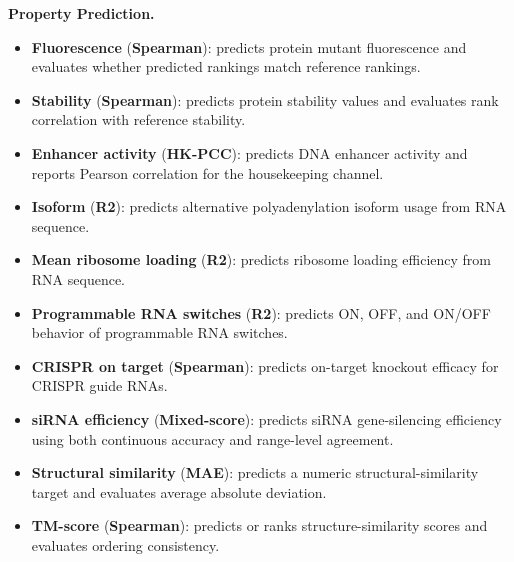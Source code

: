 \begin{appendices}
\textbf{Property Prediction.}
\begin{itemize}
    \item \textbf{Fluorescence} (\textbf{Spearman}): predicts protein mutant fluorescence and evaluates whether predicted rankings match reference rankings.
    \item \textbf{Stability} (\textbf{Spearman}): predicts protein stability values and evaluates rank correlation with reference stability.
    \item \textbf{Enhancer activity} (\textbf{HK-PCC}): predicts DNA enhancer activity and reports Pearson correlation for the housekeeping channel.
    \item \textbf{Isoform} (\textbf{R2}): predicts alternative polyadenylation isoform usage from RNA sequence.
    \item \textbf{Mean ribosome loading} (\textbf{R2}): predicts ribosome loading efficiency from RNA sequence.
    \item \textbf{Programmable RNA switches} (\textbf{R2}): predicts ON, OFF, and ON/OFF behavior of programmable RNA switches.
    \item \textbf{CRISPR on target} (\textbf{Spearman}): predicts on-target knockout efficacy for CRISPR guide RNAs.
    \item \textbf{siRNA efficiency} (\textbf{Mixed-score}): predicts siRNA gene-silencing efficiency using both continuous accuracy and range-level agreement.
    \item \textbf{Structural similarity} (\textbf{MAE}): predicts a numeric structural-similarity target and evaluates average absolute deviation.
    \item \textbf{TM-score} (\textbf{Spearman}): predicts or ranks structure-similarity scores and evaluates ordering consistency.
\end{itemize}


\end{appendices}
